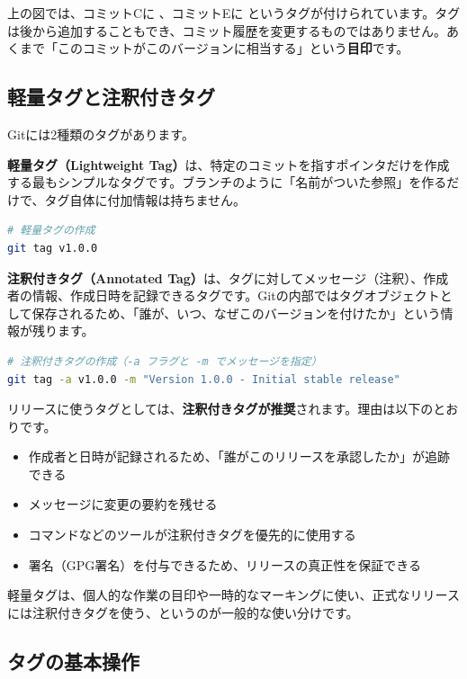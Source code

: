上の図では、コミットCに 、コミットEに  というタグが付けられています。タグは後から追加することもでき、コミット履歴を変更するものではありません。あくまで「このコミットがこのバージョンに相当する」という\textbf{目印}です。

\subsection{軽量タグと注釈付きタグ}

Gitには2種類のタグがあります。

\textbf{軽量タグ（Lightweight Tag）}は、特定のコミットを指すポインタだけを作成する最もシンプルなタグです。ブランチのように「名前がついた参照」を作るだけで、タグ自体に付加情報は持ちません。

\begin{lstlisting}[language=bash]
# 軽量タグの作成
git tag v1.0.0
\end{lstlisting}

\textbf{注釈付きタグ（Annotated Tag）}は、タグに対してメッセージ（注釈）、作成者の情報、作成日時を記録できるタグです。Gitの内部ではタグオブジェクトとして保存されるため、「誰が、いつ、なぜこのバージョンを付けたか」という情報が残ります。

\begin{lstlisting}[language=bash]
# 注釈付きタグの作成（-a フラグと -m でメッセージを指定）
git tag -a v1.0.0 -m "Version 1.0.0 - Initial stable release"
\end{lstlisting}

リリースに使うタグとしては、\textbf{注釈付きタグが推奨}されます。理由は以下のとおりです。

\begin{itemize}
  \item 作成者と日時が記録されるため、「誰がこのリリースを承認したか」が追跡できる
  \item メッセージに変更の要約を残せる
  \item {} コマンドなどのツールが注釈付きタグを優先的に使用する
  \item 署名（GPG署名）を付与できるため、リリースの真正性を保証できる
\end{itemize}

軽量タグは、個人的な作業の目印や一時的なマーキングに使い、正式なリリースには注釈付きタグを使う、というのが一般的な使い分けです。

\subsection{タグの基本操作}

